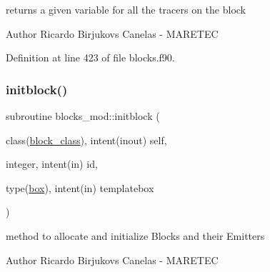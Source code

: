 returns a given variable for all the tracers on the block 

\begin{DoxyAuthor}{Author}
Ricardo Birjukovs Canelas -\/ M\+A\+R\+E\+T\+EC 
\end{DoxyAuthor}


Definition at line 423 of file blocks.\+f90.


\mbox{\label{namespaceblocks__mod_a534ca69b17b6f54ee07f995b02feff39}} 
\subsubsection{\texorpdfstring{initblock()}{initblock()}}
{\footnotesize\ttfamily subroutine blocks\+\_\+mod\+::initblock (\begin{DoxyParamCaption}\item[{class(\mbox{\hyperlink{structblocks__mod_1_1block__class}{block\+\_\+class}}), intent(inout)}]{self,  }\item[{integer, intent(in)}]{id,  }\item[{type(\mbox{\hyperlink{structgeometry__mod_1_1box}{box}}), intent(in)}]{templatebox }\end{DoxyParamCaption})\hspace{0.3cm}{\ttfamily [private]}}



method to allocate and initialize Blocks and their Emitters 

\begin{DoxyAuthor}{Author}
Ricardo Birjukovs Canelas -\/ M\+A\+R\+E\+T\+EC 
\end{DoxyAuthor}

